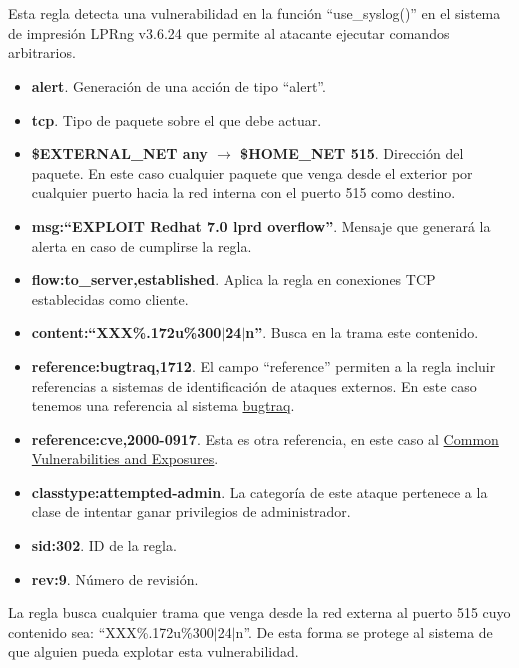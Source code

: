 \documentclass[10pt,a4paper]{article}
\begin{document}
\pagebreak
\section{}
Esta regla detecta una vulnerabilidad en la función ``use\_syslog()'' en el sistema de impresión LPRng v3.6.24 que permite al atacante ejecutar comandos arbitrarios.
\begin{itemize}
\item \textbf{alert}. Generación de una acción de tipo ``alert''.
\item \textbf{tcp}. Tipo de paquete sobre el que debe actuar.
\item \textbf{\$EXTERNAL\_NET any $\rightarrow$ \$HOME\_NET 515}. Dirección del paquete. En este caso cualquier paquete que venga desde el exterior por cualquier puerto hacia la red interna con el puerto 515 como destino.
\item \textbf{msg:``EXPLOIT Redhat 7.0 lprd overflow''}. Mensaje que generará la alerta en caso de cumplirse la regla.
\item \textbf{flow:to\_server,established}. Aplica la regla en conexiones TCP establecidas como cliente.
\item \textbf{content:``XXX\%.172u\%300$\vert$24$\vert$n''}. Busca en la trama este contenido.
\item \textbf{reference:bugtraq,1712}. El campo ``reference'' permiten a la regla incluir referencias a sistemas de identificación de ataques externos. En este caso tenemos una referencia al sistema \href{https://www.securityfocus.com/bid/}{bugtraq}.
\item \textbf{reference:cve,2000-0917}. Esta es otra referencia, en este caso al \href{http://cve.mitre.org/cgi-bin/cvename.cgi?name=}{Common Vulnerabilities and Exposures}.
\item \textbf{classtype:attempted-admin}. La categoría de este ataque pertenece a la clase de intentar ganar privilegios de administrador.
\item \textbf{sid:302}. ID de la regla.
\item \textbf{rev:9}. Número de revisión.
\end{itemize}
La regla busca cualquier trama que venga desde la red externa al puerto 515 cuyo contenido sea: ``XXX\%.172u\%300$\vert$24$\vert$n''.
De esta forma se protege al sistema de que alguien pueda explotar esta vulnerabilidad.

\section{}
\end{document}
